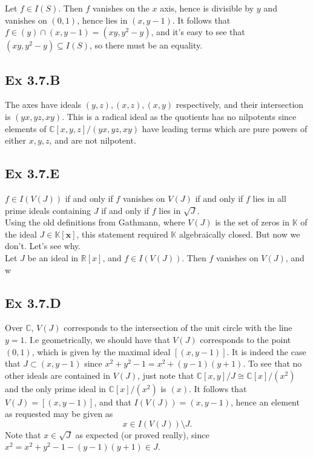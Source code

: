 \documentclass{article}
\theoremstyle{definition}
\newcommand{\R}{\mathbb{R}}
\newcommand{\C}{\mathbb{C}}
\newcommand{\K}{\mathbb{K}}
\newcommand{\Kx}{\K[\bm{x}]}
\begin{document}
Let $f \in I(S)$. Then $f$ vanishes on the $x$ axis, hence is divisible by $y$
and vanishes on $(0, 1)$, hence lies in $(x, y - 1)$. It follows that $f \in
	(y) \cap (x, y-1) = (xy, y^2 - y)$, and it's easy to see that $(xy, y^2 - y)
	\subseteq I(S)$, so there must be an equality.

\subsection*{Ex 3.7.B}

The axes have ideals $(y, z), (x, z), (x, y)$ respectively, and their
intersection is $(yx, yz, xy)$. This is a radical ideal as the quotients has no
nilpotents since elements of $\C[x, y, z]/(yx,yz,xy)$ have leading terms which
are pure powers of either $x, y, z$, and are not nilpotent.

\subsection*{Ex 3.7.E}

$f \in I(V(J))$ if and only if $f$ vanishes on $V(J)$ if and only if $f$ lies
in all prime ideals containing $J$ if and only if $f$ lies in $\sqrt{J}$. \\

Using the old definitions from Gathmann, where $V(J)$ is the set of zeros in
$\K$ of the ideal $J \in \Kx$, this statement required $\K$ algebraically
closed. But now we don't. Let's see why. \\

Let $J$ be an ideal in $\R[x]$, and $f \in I(V(J))$. Then $f$ vanishes on $V(J)$,
and w

\subsection*{Ex 3.7.D}

Over $\C$, $V(J)$ corresponds to the intersection of the unit circle with the
line $y = 1$. I.e geometrically, we should have that $V(J)$ corresponds to the
point $(0, 1)$, which is given by the maximal ideal $[(x, y - 1)]$. It is
indeed the case that $J \subset (x, y - 1)$ since $x^2 + y^2 - 1 = x^2 + (y -
	1)(y + 1)$. To see that no other ideals are contained in $V(J)$, just note that
$\C[x, y]/J \cong \C[x]/(x^2)$ and the only prime ideal in $\C[x]/(x^2)$ is $(x)$.
It follows that $V(J) = [(x, y - 1)]$, and that $I(V(J)) = (x, y - 1)$, hence
an element as requested may be given as
\[
	x \in I(V(J)) \setminus J.
\]
Note that $x \in \sqrt{J}$ as expected (or proved really), since $x^2 = x^2 +
	y^2 - 1 - (y-1)(y+1) \in J$.
\end{document}
